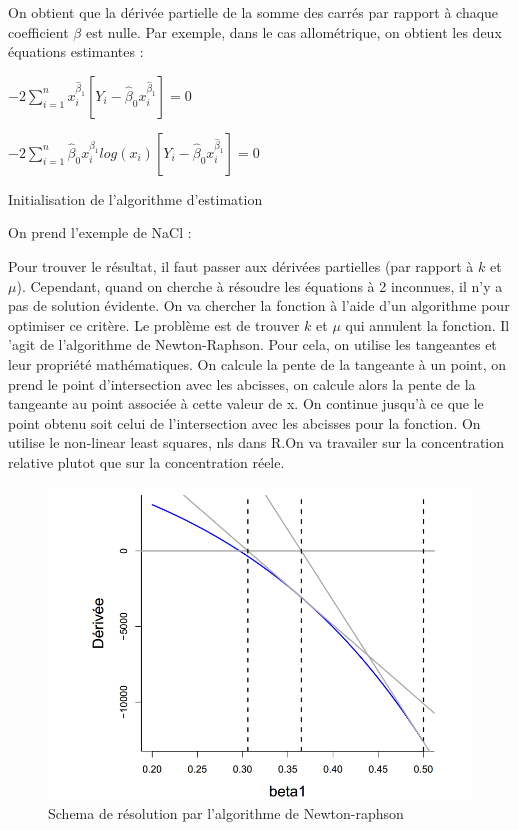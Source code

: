 \documentclass[
]{article}
\begin{document}
On obtient que la dérivée partielle de la somme des carrés par rapport à
chaque coefficient \(\beta\) est nulle. Par exemple, dans le cas
allométrique, on obtient les deux équations estimantes :

\begin{center}
 $-2 \sum_{i=1}^{n}x_{i}^{ \hat{ \beta}_{1}}[Y_{i}- \hat{ \beta}_{0}x_{i}^{ \hat{ \beta}_{1}}]=0$

$-2 \sum_{i=1}^{n} \hat{ \beta}_{0}x_{i}^{ \hat{ \beta}_{1}}log(x_{i})[Y_{i}- \hat{ \beta}_{0}x_{i}^{ \hat{\beta}_{1}}]=0$
\end{center}

Initialisation de l'algorithme d'estimation

On prend l'exemple de NaCl :

Pour trouver le résultat, il faut passer aux dérivées partielles (par
rapport à \(k\) et \(\mu\)). Cependant, quand on cherche à résoudre les
équations à 2 inconnues, il n'y a pas de solution évidente. On va
chercher la fonction à l'aide d'un algorithme pour optimiser ce critère.
Le problème est de trouver \(k\) et \(\mu\) qui annulent la fonction. Il
'agit de l'algorithme de Newton-Raphson. Pour cela, on utilise les
tangeantes et leur propriété mathématiques. On calcule la pente de la
tangeante à un point, on prend le point d'intersection avec les
abcisses, on calcule alors la pente de la tangeante au point associée à
cette valeur de x. On continue jusqu'à ce que le point obtenu soit celui
de l'intersection avec les abcisses pour la fonction. On utilise le
non-linear least squares, nls dans R.On va travailer sur la
concentration relative plutot que sur la concentration réele.

\begin{figure}
  \centering
  \includegraphics{Regression/Newton-Raphson.png}
  \caption{Schema de résolution par l'algorithme de Newton-raphson}
  \label{NewtonRaphson}
\end{figure}
\end{document}
